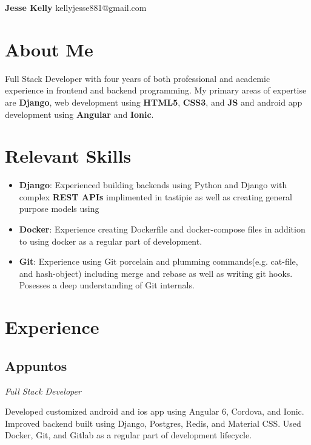 \documentclass[letterpaper,11pt]{article}
\begin{document}
\begin{flushleft}
\Large{\textbf{Jesse Kelly}}
\newline
kellyjesse881@gmail.com
\end{flushleft}

\section{About Me}
Full Stack Developer with four years of both
professional and academic experience in frontend
and backend programming. My primary areas of
expertise are \textbf{Django}, web development using \textbf{HTML5},
\textbf{CSS3}, and \textbf{JS} and android app development using
\textbf{Angular} and \textbf{Ionic}.

\section{Relevant Skills}
\begin{itemize}
\item \textbf{Django}: Experienced building backends using Python and Django with complex \textbf{REST APIs} implimented in tastipie as well as creating general purpose models using
\item \textbf{Docker}: Experience creating Dockerfile and docker-compose files in addition to using docker as a regular part of development.
\item \textbf{Git}: Experience using Git porcelain and plumming commands(e.g. cat-file, and hash-object) including merge and rebase as well as writing git hooks.
  Posesses a deep understanding of Git internals.
\end{itemize}

\section{Experience}
\subsection{Appuntos}
\textit{Full Stack Developer}
\vspace{2mm}
\begin{adjustwidth}{1cm}{1cm}
Developed customized android and ios
app using Angular 6, Cordova, and Ionic.
Improved backend built using Django,
Postgres, Redis, and Material CSS. Used
Docker, Git, and Gitlab as a regular part
of development lifecycle.
\end{adjustwidth}
\end{document}
